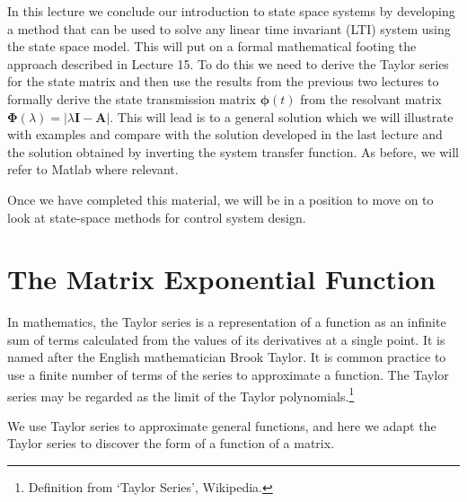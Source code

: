 \def\FileDate{10/02/01}
\def\FileVersion{1.0}

In this lecture we conclude our introduction to state space systems by developing a method that can be used to solve any linear time invariant (LTI) system using the state space model. This will put on a formal mathematical footing the approach described in Lecture 15. To do this we need to derive the Taylor series for the state matrix and then use the results from the previous two lectures to formally derive the state transmission matrix $\mathbf{\phi}(t)$ from the resolvant matrix $\mathbf{\Phi}(\lambda) = |\lambda\mathbf{I}-\mathbf{A}|$. This will lead is to a general solution which we will illustrate with examples and compare with the solution developed in the last lecture and the solution obtained by inverting the system transfer function. As before, we will refer to Matlab where relevant.

Once we have completed this material, we will be in a position to move on to look at state-space methods for control system design.

\section*{The Matrix Exponential Function}

In mathematics, the Taylor series is a representation of a function as an infinite sum of terms calculated from the values of its derivatives at a single point. It is named after the English mathematician Brook Taylor. It is common practice to use a finite number of terms of the series to approximate a function. The Taylor series may be regarded as the limit of the Taylor polynomials.\footnote{Definition from `Taylor Series', Wikipedia.}

We use Taylor series to approximate general functions, and here we adapt the Taylor series to discover the form of a function of a matrix.
 

\ifslidesonly
\begin{slide}
   
\end{slide}
\fi

 


\ifslidesonly
\begin{slide}
   
\end{slide}
\fi


